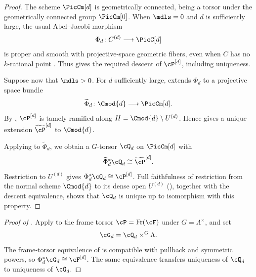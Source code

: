\begin{proof}
The scheme $\PicCm[d]$ is geometrically connected, being a torsor under
the geometrically connected group $\PicCm[0]$.
When $\mdls=0$ and $d$ is sufficiently large, the usual Abel--Jacobi morphism
\[
\Phi_d\colon C^{(d)}\longrightarrow\PicC[d]
\]
is proper and smooth with projective-space geometric fibers, even when $C$
has no $k$-rational point
\cite[Corollary~3.9]{takeuchi2018blow}. Thus
 gives the required descent of
$\cP^{[d]}$, including uniqueness.

Suppose now that $\mdls>0$. For $d$ sufficiently large,
 extends $\Phi_d$ to a
projective space bundle
\[
\widetilde\Phi_d\colon
\Cmod{d}\longrightarrow\PicCm[d].
\]
By ,
$\cP^{[d]}$ is tamely ramified along
$H=\Cmod{d}\setminus U^{(d)}$. Hence
 gives a unique extension
$\widetilde{\cP}^{[d]}$ to $\Cmod{d}$.

Applying  to
$\widetilde\Phi_d$, we obtain a $G$-torsor $\cQ_d$ on $\PicCm[d]$ with
\[
\widetilde\Phi_d^*\cQ_d\cong\widetilde{\cP}^{[d]}.
\]
Restriction to $U^{(d)}$ gives $\Phi_d^*\cQ_d\cong\cP^{[d]}$.
Full faithfulness of restriction from the normal scheme $\Cmod{d}$ to its
dense open $U^{(d)}$ (), together with the descent
equivalence, shows that $\cQ_d$ is unique up to isomorphism with this
property.
\end{proof}

\begin{proof}[Proof of ]
Apply  to the frame torsor
$\cP=\operatorname{Fr}(\cF)$ under $G=\Lambda^\times$, and set
\[
\cG_d=\cQ_d\times^G\Lambda.
\]
The frame-torsor equivalence of  is
compatible with pullback and symmetric powers, so
$\Phi_d^*\cG_d\cong\cF^{[d]}$. The same equivalence transfers uniqueness
of $\cQ_d$ to uniqueness of $\cG_d$.
\end{proof}
